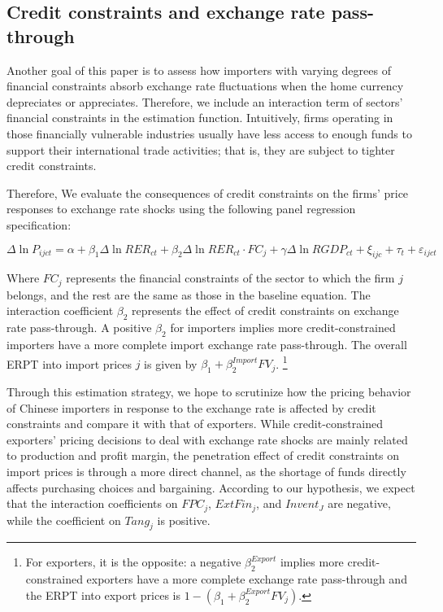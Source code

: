 \documentclass[12pt]{article}
\begin{document}
\subsection{Credit constraints and exchange rate pass-through} \label{Empirical-Credit}

Another goal of this paper is to assess how importers with varying degrees of financial constraints absorb exchange rate fluctuations when the home currency depreciates or appreciates. Therefore, we include an interaction term of sectors’ financial constraints in the estimation function. Intuitively, firms operating in those financially vulnerable industries usually have less access to enough funds to support their international trade activities; that is, they are subject to tighter credit constraints.

Therefore, We evaluate the consequences of credit constraints on the firms' price responses to exchange rate shocks using the following panel regression specification:

\begin{equation}
	\Delta \ln P_{ijct}=\alpha+\beta_{1} \Delta \ln RER_{ct}+\beta_{2} \Delta \ln RER_{ct} \cdot FC_{j}+\gamma \Delta \ln RGDP_{ct}+\xi_{ijc}+\tau_{t} +\varepsilon_{ijct}
	\label{eq.credit}
\end{equation}

Where $FC_{j}$ represents the financial constraints of the sector to which the firm $j$ belongs, and the rest are the same as those in the baseline equation. The interaction coefficient $\beta_2$ represents the effect of credit constraints on exchange rate pass-through. A positive $\beta_2$ for importers implies more credit-constrained importers have a more complete import exchange rate pass-through. The overall ERPT into import prices $j$ is given by $\beta_{1} +\beta^{Import}_{2} FV_j$. \footnote{For exporters, it is the opposite: a negative $\beta^{Export}_2$ implies more credit-constrained exporters have a more complete exchange rate pass-through and the ERPT into export prices is $1-(\beta_{1} +\beta^{Export}_{2} FV_j)$.}

Through this estimation strategy, we hope to scrutinize how the pricing behavior of Chinese importers in response to the exchange rate is affected by credit constraints and compare it with that of exporters. While credit-constrained exporters’ pricing decisions to deal with exchange rate shocks are mainly related to production and profit margin, the penetration effect of credit constraints on import prices is through a more direct channel, as the shortage of funds directly affects purchasing choices and bargaining. According to our hypothesis, we expect that the interaction coefficients on $FPC_{j}$, $ExtFin_j$, and $Invent_J$ are negative, while the coefficient on $Tang_j$ is positive.
\end{document}
